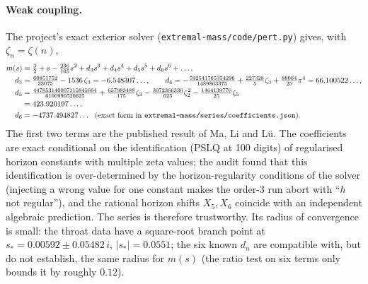 \paragraph{Weak coupling.} The project's exact exterior solver (\texttt{extremal-mass/code/pert.py})
gives, with $\zeta_n=\zeta(n)$,
\begin{align}
 m(s)&=\tfrac32+s-\tfrac{236}{105}s^2+d_3s^3+d_4s^4+d_5s^5+d_6s^6+\dots,\\
 d_3&=\tfrac{60851752}{33075}-1536\,\zeta_3=-6.548307\ldots,\qquad
 d_4=-\tfrac{592541765354296}{1489863375}+\tfrac{227328}{5}\zeta_3+\tfrac{88064}{25}\pi^4=66.100522\ldots,\nonumber\\
 d_5&=\tfrac{447853140007115845664}{6100990520625}+\tfrac{657983488}{175}\zeta_3-\tfrac{3972366336}{625}\zeta_2^2-\tfrac{1464139776}{25}\zeta_5\nonumber\\&=423.920197\ldots,\nonumber\\
 d_6&=-4737.494827\ldots\ \ (\text{exact form in \texttt{extremal-mass/series/coefficients.json}}).\nonumber
\end{align}
The first two terms are the published result of Ma, Li and L\"u. The coefficients are exact
conditional on the identification (PSLQ at 100 digits) of regularised horizon constants with
multiple zeta values; the audit found that this identification is over-determined by the
horizon-regularity conditions of the solver (injecting a wrong value for one constant makes the
order-3 run abort with ``$h$ not regular''), and the rational horizon shifts $X_5,X_6$ coincide with
an independent algebraic prediction. The series is therefore trustworthy. Its radius of
convergence is small: the throat data have a square-root branch point at
$s_*=0.00592\pm0.05482\,i$, $|s_*|=0.0551$; the six known $d_n$ are compatible with, but do not
establish, the same radius for $m(s)$ (the ratio test on six terms only bounds it by roughly
$0.12$).

